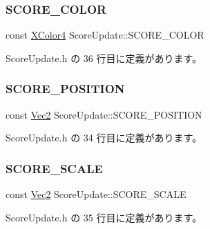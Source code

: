 \subsubsection{\texorpdfstring{S\+C\+O\+R\+E\+\_\+\+C\+O\+L\+OR}{SCORE\_COLOR}}
{\footnotesize\ttfamily const \mbox{\hyperlink{_vector3_d_8h_a680c30c4a07d86fe763c7e01169cd6cc}{X\+Color4}} Score\+Update\+::\+S\+C\+O\+R\+E\+\_\+\+C\+O\+L\+OR\hspace{0.3cm}{\ttfamily [static]}}



 Score\+Update.\+h の 36 行目に定義があります。

\mbox{\label{class_score_update_a88bd91fc66dd629a849ab9f0a178150c}} 
\subsubsection{\texorpdfstring{S\+C\+O\+R\+E\+\_\+\+P\+O\+S\+I\+T\+I\+ON}{SCORE\_POSITION}}
{\footnotesize\ttfamily const \mbox{\hyperlink{_vector3_d_8h_a5ef6e95dfc5f9d3820b71772d99bbc25}{Vec2}} Score\+Update\+::\+S\+C\+O\+R\+E\+\_\+\+P\+O\+S\+I\+T\+I\+ON\hspace{0.3cm}{\ttfamily [static]}}



 Score\+Update.\+h の 34 行目に定義があります。

\mbox{\label{class_score_update_a23e9b8c4c6624cf5f3b66258771b3243}} 
\subsubsection{\texorpdfstring{S\+C\+O\+R\+E\+\_\+\+S\+C\+A\+LE}{SCORE\_SCALE}}
{\footnotesize\ttfamily const \mbox{\hyperlink{_vector3_d_8h_a5ef6e95dfc5f9d3820b71772d99bbc25}{Vec2}} Score\+Update\+::\+S\+C\+O\+R\+E\+\_\+\+S\+C\+A\+LE\hspace{0.3cm}{\ttfamily [static]}}



 Score\+Update.\+h の 35 行目に定義があります。



